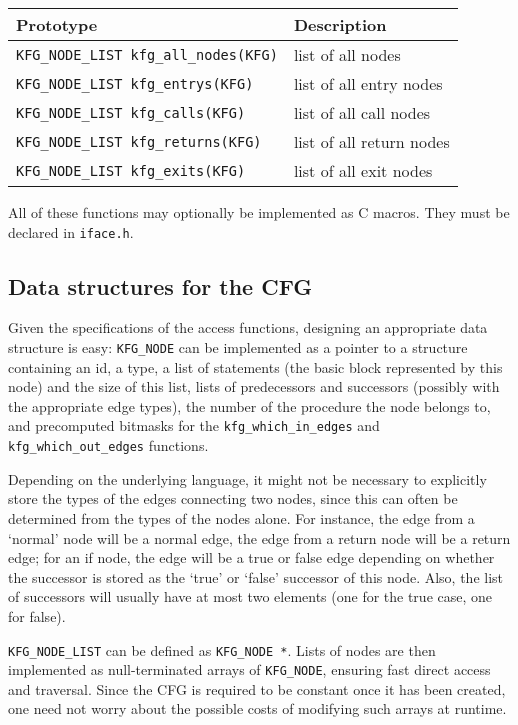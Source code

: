 \documentclass[12pt]{article}
\begin{document}
\begin{longtable}{|p{} | p{}|}
\hline
Prototype & Description \\
\hline
\hline \endhead
\verb|KFG_NODE_LIST kfg_all_nodes(KFG)|
    & list of all nodes \\
\hline
\verb|KFG_NODE_LIST kfg_entrys(KFG)|
    & list of all entry nodes \\
\hline
\verb|KFG_NODE_LIST kfg_calls(KFG)|
    & list of all call nodes \\
\hline
\verb|KFG_NODE_LIST kfg_returns(KFG)|
    & list of all return nodes \\
\hline
\verb|KFG_NODE_LIST kfg_exits(KFG)|
    & list of all exit nodes \\
\hline
\end{longtable}

All of these functions may optionally be implemented as C macros.
They must be declared in \verb|iface.h|.

\subsection{Data structures for the CFG}

Given the specifications of the access functions, designing an
appropriate data structure is easy: \verb|KFG_NODE| can be
implemented as a pointer to a structure containing an id, a type, a
list of statements (the basic block represented by this node) and
the size of this list, lists of predecessors and successors
(possibly with the appropriate edge types), the number of the
procedure the node belongs to, and precomputed bitmasks for the
\verb|kfg_which_in_edges| and \verb|kfg_which_out_edges| functions.

Depending on the underlying language, it might not be necessary to
explicitly store the types of the edges connecting two nodes, since
this can often be determined from the types of the nodes alone. For
instance, the edge from a `normal' node will be a normal edge, the
edge from a return node will be a return edge; for an if node, the
edge will be a true or false edge depending on whether the successor
is stored as the `true' or `false' successor of this node. Also, the
list of successors will usually have at most two elements (one for
the true case, one for false).

\verb|KFG_NODE_LIST| can be defined as \verb|KFG_NODE *|. Lists of
nodes are then implemented as null-terminated arrays of
\verb|KFG_NODE|, ensuring fast direct access and traversal. Since
the CFG is required to be constant once it has been created, one
need not worry about the possible costs of modifying such arrays at
runtime.
\end{document}
